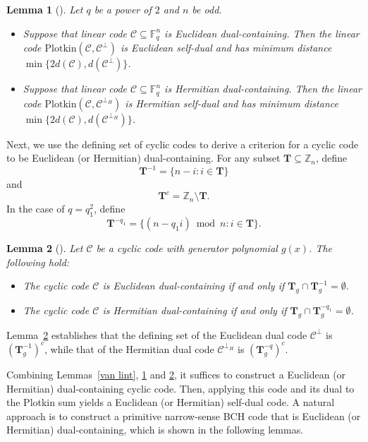 \documentclass[journal,12pt,onecolumn]{IEEEtran}
\newtheorem{lemma}{Lemma}
\begin{document}
\begin{lemma}[\cite{10856234}]
\label{self-dual}
    Let $q$ be a power of $2$ and $n$ be odd.
    \begin{itemize}
        \item Suppose that linear code $\mathcal{C}\subseteq \mathbb{F}_q^n$ is Euclidean dual-containing. Then the linear code $\text{Plotkin}(\mathcal{C},\mathcal{C}^\perp)$ is Euclidean self-dual and has minimum distance $\min\{2d(\mathcal{C}),d(\mathcal{C}^\perp)\}$.
        \item Suppose that linear code $\mathcal{C}\subseteq\mathbb{F}_q^n$ is Hermitian dual-containing. Then the linear code $\text{Plotkin}(\mathcal{C},\mathcal{C}^{\perp_H})$ is Hermitian self-dual and has minimum distance $\min\{2d(\mathcal{C}),d(\mathcal{C}^{\perp_H})\}$.
    \end{itemize}
\end{lemma}

Next, we use the defining set of cyclic codes to derive a criterion for a cyclic code to be Euclidean (or Hermitian) dual-containing. For any subset $\textbf{T}\subseteq \mathbb{Z}_n$, define 
\[\textbf{T}^{-1}=\{n-i:i\in \textbf{T}\}\]
and 
\[\textbf{T}^c=\mathbb{Z}_n\setminus \textbf{T}.\]
In the case of $q=q_1^2$, define 
\[\textbf{T}^{-q_1}=\{(n-q_1i)\bmod n:i\in\textbf{T}\}.\]

\begin{lemma}[\cite{4106108}]
\label{defining set}
    Let $\mathcal{C}$ be a cyclic code with generator polynomial $g(x)$. The following hold:
    \begin{itemize}
        \item The cyclic code $\mathcal{C}$ is Euclidean dual-containing if and only if $\textbf{T}_g\cap \textbf{T}_g^{-1}=\emptyset$.
        \item The cyclic code $\mathcal{C}$ is Hermitian dual-containing if and only if $\textbf{T}_g\cap\textbf{T}_g^{-q_1}=\emptyset$.
    \end{itemize}
\end{lemma}

Lemma~\ref{defining set} establishes that the defining set of the Euclidean dual code $\mathcal{C}^{\perp}$ is $(\mathbf{T}_g^{-1})^c$, while that of the Hermitian dual code $\mathcal{C}^{\perp_H}$ is $(\mathbf{T}_g^{-q})^c$.

Combining Lemmas~\ref{van lint}, \ref{self-dual} and \ref{defining set}, it suffices to construct a Euclidean (or Hermitian) dual-containing cyclic code. Then, applying this code and its dual to the Plotkin sum yields a Euclidean (or Hermitian) self-dual code. A natural approach is to construct a primitive narrow-sense BCH code that is Euclidean (or Hermitian) dual-containing, which is shown in the following lemmas.
\end{document}

